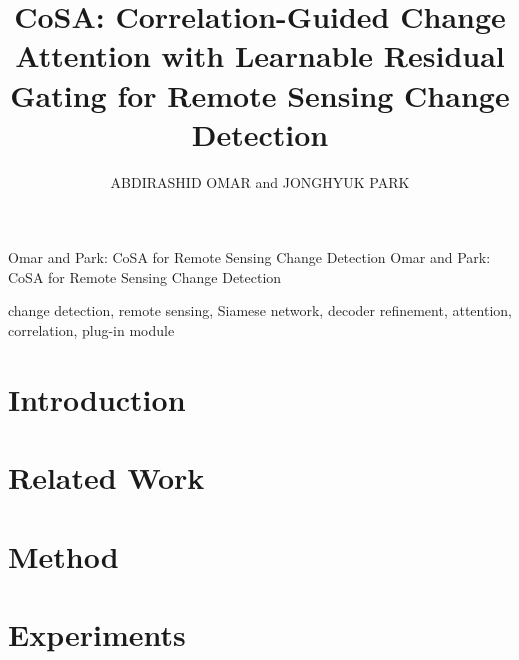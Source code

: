\documentclass{ieeeaccess}
\newcommand{\cosa}{CoSA}
\begin{document}

\title{\cosa{}: Correlation-Guided Change Attention with Learnable Residual Gating for Remote Sensing Change Detection}

\author{\uppercase{Abdirashid Omar} and \uppercase{Jonghyuk Park}}
\address[1]{Department of Data Science, Graduate School of Kookmin University, Seoul, Republic of Korea}
\markboth
{Omar and Park: \cosa{} for Remote Sensing Change Detection}
{Omar and Park: \cosa{} for Remote Sensing Change Detection}

\begin{abstract}

\end{abstract}

\begin{keywords}
change detection, remote sensing, Siamese network, decoder refinement, attention, correlation, plug-in module
\end{keywords}

\titlepgskip=-21pt
\maketitle
\raggedbottom

\section{Introduction}\label{sec:introduction}


\section{Related Work}\label{sec:related_work}


\section{Method}\label{sec:method}


\section{Experiments}\label{sec:experiments}



\end{document}
